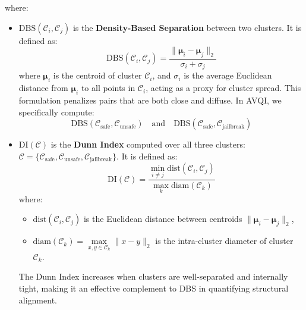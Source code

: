 \noindent where:
\begin{itemize}
    \item \(\mathrm{DBS}(\mathcal{C}_i, \mathcal{C}_j)\) is the \textbf{Density-Based Separation} between two clusters. It is defined as:
    \[
    \mathrm{DBS}(\mathcal{C}_i, \mathcal{C}_j) = \frac{\|\boldsymbol{\mu}_i - \boldsymbol{\mu}_j\|_2}{\sigma_i + \sigma_j}
    \]
    where \(\boldsymbol{\mu}_i\) is the centroid of cluster \(\mathcal{C}_i\), and \(\sigma_i\) is the average Euclidean distance from \(\boldsymbol{\mu}_i\) to all points in \(\mathcal{C}_i\), acting as a proxy for cluster spread. This formulation penalizes pairs that are both close and diffuse. In AVQI, we specifically compute:
    \[
    \mathrm{DBS}(\mathcal{C}_{\text{safe}}, \mathcal{C}_{\text{unsafe}}) \quad \text{and} \quad \mathrm{DBS}(\mathcal{C}_{\text{safe}}, \mathcal{C}_{\text{jailbreak}})
    \]

    \item \(\mathrm{DI}(\mathcal{C})\) is the \textbf{Dunn Index} computed over all three clusters: \(\mathcal{C} = \{\mathcal{C}_{\text{safe}}, \mathcal{C}_{\text{unsafe}}, \mathcal{C}_{\text{jailbreak}}\}\). It is defined as:
    \[
    \mathrm{DI}(\mathcal{C}) = \frac{\min\limits_{i \ne j} \mathrm{dist}(\mathcal{C}_i, \mathcal{C}_j)}{\max\limits_{k} \mathrm{diam}(\mathcal{C}_k)}
    \]
    where:
    \begin{itemize}
        \item \(\mathrm{dist}(\mathcal{C}_i, \mathcal{C}_j)\) is the Euclidean distance between centroids \(\|\boldsymbol{\mu}_i - \boldsymbol{\mu}_j\|_2\),
        \item \(\mathrm{diam}(\mathcal{C}_k) = \max\limits_{x,y \in \mathcal{C}_k} \|x - y\|_2\) is the intra-cluster diameter of cluster \(\mathcal{C}_k\).
    \end{itemize}
    The Dunn Index increases when clusters are well-separated and internally tight, making it an effective complement to DBS in quantifying structural alignment.
\end{itemize}




